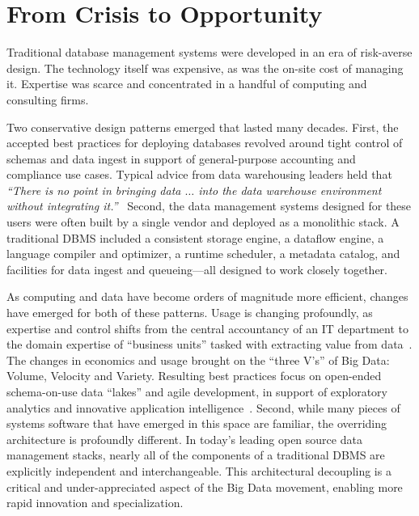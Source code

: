 \documentclass{sig-alternate}
\begin{document}
\section{From Crisis to Opportunity}
Traditional database management systems were developed in an era of risk-averse design.
The technology itself was expensive, as was the on-site cost of managing it. Expertise
was scarce and concentrated in a handful of computing and consulting firms.

Two conservative design patterns emerged that lasted many decades. First, the accepted best practices
for deploying databases revolved around tight control of schemas and data ingest in support of 
general-purpose accounting and compliance use cases. 
Typical advice from data
warehousing leaders held that 
\emph{``There is no point in 
bringing data $\ldots$ into the data warehouse environment without integrating it.''}~\cite{inmon2005building} 
Second, 
the data management systems designed for these users were often built by a single vendor and deployed as a
monolithic stack. %
A traditional DBMS included a consistent storage engine, a dataflow engine, 
a language compiler and optimizer, a runtime scheduler, a metadata catalog, and facilities for data ingest 
and queueing---all designed to work closely together.


As computing and data have become orders of magnitude more efficient, changes have emerged for both of these patterns. 
Usage is changing profoundly, as expertise and control shifts from the central accountancy of an IT department to 
the domain expertise of ``business units'' tasked with extracting value from data~\cite{gartner}. 
The changes in economics and usage brought on the ``three V's'' of Big Data: Volume, Velocity and Variety.
Resulting best practices focus on open-ended schema-on-use
data ``lakes'' and agile development, in support of exploratory analytics and innovative application intelligence~\cite{patil2012data}. 
Second, while many pieces of systems software that have emerged in this space are familiar, the overriding architecture is profoundly 
different. In today's leading open source
data management stacks, nearly all of the components 
of a traditional DBMS are explicitly independent 
and interchangeable.  This architectural decoupling is 
a critical and under-appreciated aspect of the Big Data movement,
enabling more rapid innovation and specialization.
\end{document}
